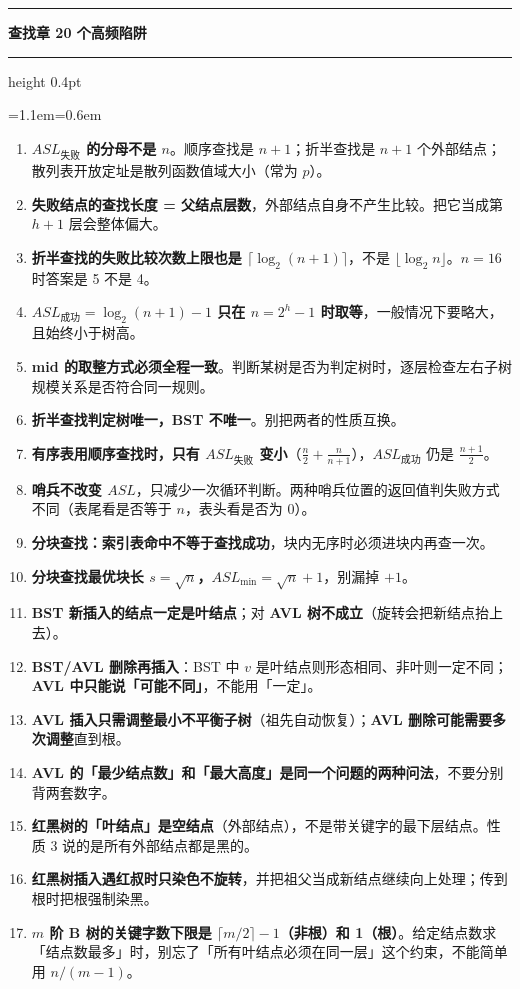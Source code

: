 \documentclass[11pt,openany,UTF8]{ctexbook}
\newcommand{\callouthead}[2]{%
  \par\addvspace{7pt}\noindent
  {\color{#1}\rule[-0.15em]{3pt}{1.05em}}\hspace{0.5em}%
  {\bfseries\color{#1}#2}\par\nobreak\vspace{-0.35em}%
  {\color{rulesep}\hrule height 0.4pt}\nobreak\vspace{0.45em}%
  \begingroup\small\setlength{\parindent}{0pt}%
  \leftskip=1.1em\rightskip=0.6em\noindent\ignorespaces}
\newcommand{\calloutend}{\par\endgroup\addvspace{7pt}}
\newenvironment{callwarn}[1]{\callouthead{warnbar}{#1}}{\calloutend}
\begin{document}
\begin{callwarn}{查找章 20 个高频陷阱}
\begin{enumerate}
\item \textbf{$ASL_{失败}$ 的分母不是 $n$}。顺序查找是 $n+1$；折半查找是 $n+1$ 个外部结点；散列表开放定址是散列函数值域大小（常为 $p$）。
\item \textbf{失败结点的查找长度 = 父结点层数}，外部结点自身不产生比较。把它当成第 $h+1$ 层会整体偏大。
\item \textbf{折半查找的失败比较次数上限也是 $\lceil\log_2(n+1)\rceil$}，不是 $\lfloor\log_2 n\rfloor$。$n=16$ 时答案是 5 不是 4。
\item \textbf{$ASL_{成功}=\log_2(n+1)-1$ 只在 $n=2^h-1$ 时取等}，一般情况下要略大，且始终小于树高。
\item \textbf{mid 的取整方式必须全程一致}。判断某树是否为判定树时，逐层检查左右子树规模关系是否符合同一规则。
\item \textbf{折半查找判定树唯一，BST 不唯一}。别把两者的性质互换。
\item \textbf{有序表用顺序查找时，只有 $ASL_{失败}$ 变小}（$\frac{n}{2}+\frac{n}{n+1}$），$ASL_{成功}$ 仍是 $\frac{n+1}{2}$。
\item \textbf{哨兵不改变 $ASL$}，只减少一次循环判断。两种哨兵位置的返回值判失败方式不同（表尾看是否等于 $n$，表头看是否为 0）。
\item \textbf{分块查找：索引表命中不等于查找成功}，块内无序时必须进块内再查一次。
\item \textbf{分块查找最优块长 $s=\sqrt n$，$ASL_{\min}=\sqrt n+1$}，别漏掉 $+1$。
\item \textbf{BST 新插入的结点一定是叶结点}；对 \textbf{AVL 树不成立}（旋转会把新结点抬上去）。
\item \textbf{BST/AVL 删除再插入}：BST 中 $v$ 是叶结点则形态相同、非叶则一定不同；\textbf{AVL 中只能说「可能不同」}，不能用「一定」。
\item \textbf{AVL 插入只需调整最小不平衡子树}（祖先自动恢复）；\textbf{AVL 删除可能需要多次调整}直到根。
\item \textbf{AVL 的「最少结点数」和「最大高度」是同一个问题的两种问法}，不要分别背两套数字。
\item \textbf{红黑树的「叶结点」是空结点}（外部结点），不是带关键字的最下层结点。性质 3 说的是所有外部结点都是黑的。
\item \textbf{红黑树插入遇红叔时只染色不旋转}，并把祖父当成新结点继续向上处理；传到根时把根强制染黑。
\item \textbf{$m$ 阶 B 树的关键字数下限是 $\lceil m/2\rceil-1$（非根）和 1（根）}。给定结点数求「结点数最多」时，别忘了「所有叶结点必须在同一层」这个约束，不能简单用 $n/(m-1)$。

\end{enumerate}
\end{callwarn}
\end{document}
